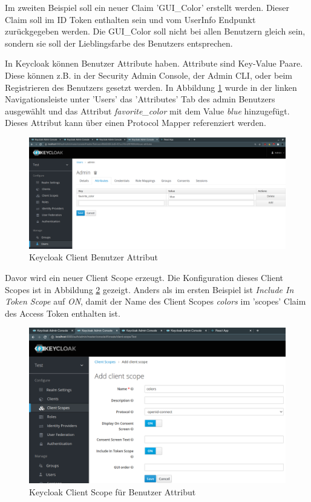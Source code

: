 Im zweiten Beispiel soll ein neuer Claim 'GUI\_Color' erstellt werden. Dieser Claim soll im ID Token enthalten sein und vom UserInfo Endpunkt zurückgegeben werden. Die GUI\_Color soll nicht bei allen Benutzern gleich sein, sondern sie soll der Lieblingsfarbe des Benutzers entsprechen.

In Keycloak können Benutzer Attribute haben. Attribute sind Key-Value Paare. Diese können z.B. in der Security Admin Console, der Admin CLI, oder beim Registrieren des Benutzers gesetzt werden. In Abbildung \ref{fig:EB_Keycloak Client User Attribut} wurde in der linken Navigationsleiste unter 'Users' das 'Attributes' Tab des admin Benutzers ausgewählt und das Attribut \textit{favorite\_color} mit dem Value \textit{blue} hinzugefügt. Dieses Attribut kann über einen Protocol Mapper referenziert werden.

\begin{figure}[!ht]
	\centering
	\includegraphics[width=1\textwidth]{Images/Ebert/KeycloakNewUserAttribute.PNG}
	\caption{Keycloak Client Benutzer Attribut}
	\label{fig:EB_Keycloak Client User Attribut}
\end{figure}

Davor wird ein neuer Client Scope erzeugt. Die Konfiguration dieses Client Scopes ist in Abbildung \ref{fig:EB_Keycloak Client Scope für User Attribut} gezeigt. Anders als im ersten Beispiel ist \textit{Include In Token Scope} auf \textit{ON}, damit der Name des Client Scopes \textit{colors} im 'scopes' Claim des Access Token enthalten ist.

\begin{figure}[!ht]
	\centering
	\includegraphics[width=1\textwidth]{Images/Ebert/KeycloakNewUserAttributeClientScope.PNG}
	\caption{Keycloak Client Scope für Benutzer Attribut}
	\label{fig:EB_Keycloak Client Scope für User Attribut}
\end{figure}


